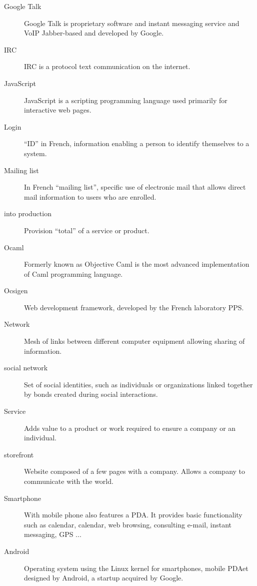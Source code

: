 \documentclass {life-en}
\begin{document}
\begin{description}
\item [Google Talk]
Google Talk is proprietary software and instant messaging service and VoIP Jabber-based and developed by Google.

\item [IRC]
IRC is a protocol text communication on the internet.

\item [JavaScript]
JavaScript is a scripting programming language used primarily for interactive web pages.

\item [Login]
``ID'' in French, information enabling a person to identify themselves to a system.

\item [Mailing list]
In French ``mailing list'', specific use of electronic mail that allows direct mail information to users who are enrolled.

\item [into production]
Provision ``total'' of a service or product.

\item [Ocaml]
Formerly known as Objective Caml is the most advanced implementation of Caml programming language.

\item [Ocsigen]
Web development framework, developed by the French laboratory PPS.

\item [Network]
Mesh of links between different computer equipment allowing sharing of information.

\item [social network]
Set of social identities, such as individuals or organizations linked together by bonds created during social interactions.

\item [Service]
Adds value to a product or work required to ensure a company or an individual.

\item [storefront]
Website composed of a few pages with a company. Allows a company to communicate with the world.

\item [Smartphone]
With mobile phone also features a PDA. It provides basic functionality such as calendar, calendar, web browsing, consulting e-mail, instant messaging, GPS ...

\item [Android]
Operating system using the Linux kernel for smartphones, mobile PDAet designed by Android, a startup acquired by Google.


\end{description}
\end{document}
